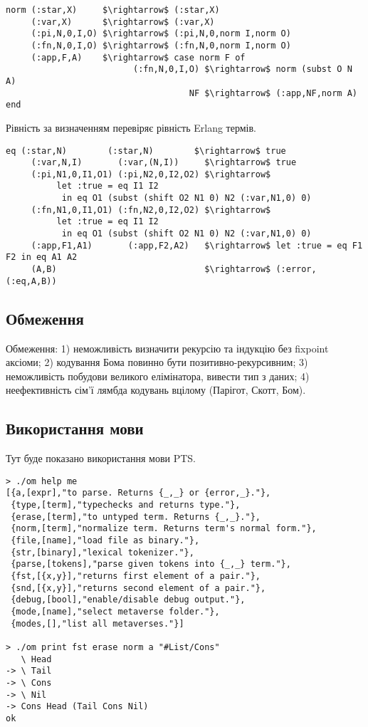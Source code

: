 \begin{lstlisting}[mathescape=true]
norm (:star,X)     $\rightarrow$ (:star,X)
     (:var,X)      $\rightarrow$ (:var,X)
     (:pi,N,0,I,O) $\rightarrow$ (:pi,N,0,norm I,norm O)
     (:fn,N,0,I,O) $\rightarrow$ (:fn,N,0,norm I,norm O)
     (:app,F,A)    $\rightarrow$ case norm F of
                         (:fn,N,0,I,O) $\rightarrow$ norm (subst O N A)
                                    NF $\rightarrow$ (:app,NF,norm A) end
\end{lstlisting}

Рівність за визначенням перевіряє рівність Erlang термів.

\begin{lstlisting}[mathescape=true]
  eq (:star,N)        (:star,N)        $\rightarrow$ true
     (:var,N,I)       (:var,(N,I))     $\rightarrow$ true
     (:pi,N1,0,I1,O1) (:pi,N2,0,I2,O2) $\rightarrow$
          let :true = eq I1 I2
           in eq O1 (subst (shift O2 N1 0) N2 (:var,N1,0) 0)
     (:fn,N1,0,I1,O1) (:fn,N2,0,I2,O2) $\rightarrow$
          let :true = eq I1 I2
           in eq O1 (subst (shift O2 N1 0) N2 (:var,N1,0) 0)
     (:app,F1,A1)       (:app,F2,A2)   $\rightarrow$ let :true = eq F1 F2 in eq A1 A2
     (A,B)                             $\rightarrow$ (:error,(:eq,A,B))
\end{lstlisting}

\subsection*{Обмеження}
Обмеження:
1) неможливість визначити рекурсію та індукцію без fixpoint аксіоми;
2) кодування Бома повинно бути позитивно-рекурсивним;
3) неможливість побудови великого елімінатора, вивести тип з даних;
4) неефективність сім'ї лямбда кодувань вцілому (Парігот, Скотт, Бом).

\newpage
\subsection{Використання мови}
Тут буде показано використання мови PTS.

\begin{lstlisting}
> ./om help me
[{a,[expr],"to parse. Returns {_,_} or {error,_}."},
 {type,[term],"typechecks and returns type."},
 {erase,[term],"to untyped term. Returns {_,_}."},
 {norm,[term],"normalize term. Returns term's normal form."},
 {file,[name],"load file as binary."},
 {str,[binary],"lexical tokenizer."},
 {parse,[tokens],"parse given tokens into {_,_} term."},
 {fst,[{x,y}],"returns first element of a pair."},
 {snd,[{x,y}],"returns second element of a pair."},
 {debug,[bool],"enable/disable debug output."},
 {mode,[name],"select metaverse folder."},
 {modes,[],"list all metaverses."}]

> ./om print fst erase norm a "#List/Cons"
   \ Head
-> \ Tail
-> \ Cons
-> \ Nil
-> Cons Head (Tail Cons Nil)
ok
\end{lstlisting}

